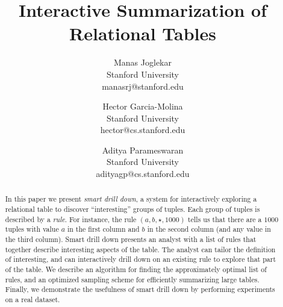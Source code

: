 \documentclass{sig-alternate}
\title{Interactive Summarization of Relational Tables}
\author{
Manas Joglekar\\Stanford University\\manasrj@stanford.edu
\and
Hector Garcia-Molina\\Stanford University\\hector@cs.stanford.edu
\and
Aditya Parameswaran\\Stanford University\\adityagp@cs.stanford.edu
}
\newcounter{prob}
\begin{document}
\maketitle


\begin{abstract}
In this paper we present {\em smart drill down},
a system for interactively exploring a relational table
to discover ``interesting'' groups of tuples.
Each group of tuples is described by a {\em rule}.
For instance, the rule $(a, b, \star, 1000)$ tells us that
there are a $1000$ tuples with value $a$ in the first column and $b$
in the second column (and any value in the third column).
Smart drill down presents an analyst with a list of rules that
together describe interesting aspects of the table.
The analyst can tailor the definition of interesting,
and can interactively drill down on an existing rule to
explore that part of the table.
We describe an
algorithm for finding the approximately optimal list of rules, and an optimized
sampling scheme for efficiently summarizing large tables. Finally, we
demonstrate the usefulness of smart drill down by performing experiments on
a real dataset.
\end{abstract}





















\begin{comment}
Notes based on Explanation Tables paper: Prove that our problem is NP-Hard to solve exactly. Something like the Set Cover Problem. 

The way we deal with overlap, is that the key differentiating factor?

We don't have the binary thing. Is it useful? Maybe we can summarize better without it. We are solving a different problem, optimising for coverage rather than explaining the binary attribute. They are optimising for KL divergence of max entropy distribution. They mention many other papers that optimize for cardinality or similar. We do weight times cardinality, which is a compromise between descriptiveness and coverage, and allow user to change the weight function. But should check those papers out anyway. 

\end{comment}

{\small 


}
\end{document}
